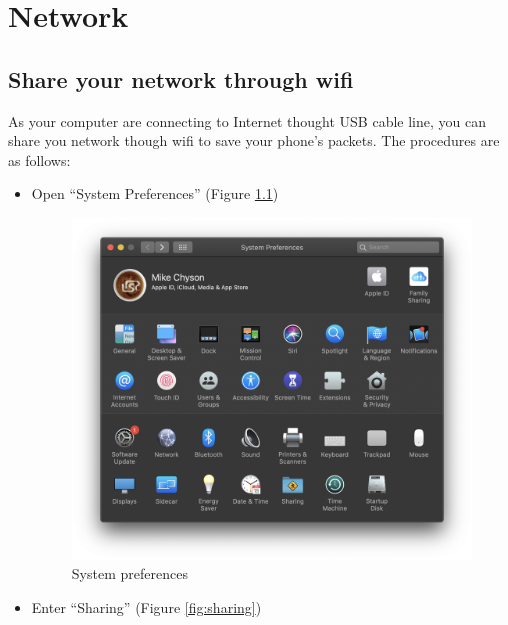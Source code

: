 
\chapter{Network}

\section{Share your network through wifi}
\label{sec:share-your-network-through-wifi}

As your computer are connecting to Internet thought USB cable line,
you can share you network though wifi to save your phone's packets.
The procedures are as follows:
\begin{itemize}
\item Open ``System Preferences'' (Figure \ref{fig:system-perferences})
  \begin{figure}[!ht]
    \centering
    \includegraphics[width=\textwidth]{pics/system-preferences.png}
    \caption{System preferences}
    \label{fig:system-perferences}
  \end{figure}
\item Enter ``Sharing'' (Figure \ref{fig:sharing})
  \begin{figure}[!hb]
    \centering

\end{figure}
\end{itemize}

